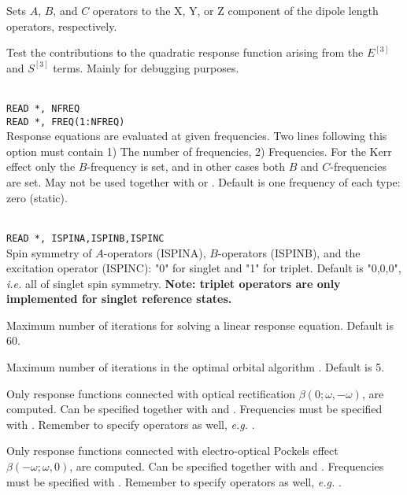 \begin{description}
\item{}
Sets $A$, $B$, and $C$ operators to the X, Y, or Z component of the
dipole length operators, respectively.

\item{}
Test the contributions to the quadratic response function arising from
the $E^{\left[3\right]}$ and $S^{\left[3\right]}$ terms.  Mainly for
debugging purposes.

\item{}\\
\verb|READ *, NFREQ|\\
\verb|READ *, FREQ(1:NFREQ)|\\
Response equations are evaluated at given
frequencies. Two lines
following this option must contain 1) The number of frequencies, 2)
Frequencies.
For the Kerr effect only the $B$-frequency is set,
and in other cases both $B$ and $C$-frequencies are set.
May not be used together with  or .
Default is one frequency of each type: zero (static).

\item{}\\
\verb|READ *, ISPINA,ISPINB,ISPINC|\\
Spin symmetry of $A$-operators (ISPINA), $B$-operators (ISPINB),
and the excitation operator (ISPINC): "0" for singlet and "1" for triplet.
Default is "0,0,0", {\it i.e.\/} all of singlet spin symmetry.
{\bf Note: triplet operators are only implemented for singlet reference states.}
\item{}
Maximum number of iterations for solving a linear response equation.
Default is 60.

\item{}
Maximum number of iterations in the optimal
orbital algorithm
\cite{tuhjahjajpjjcp84}.
Default is 5.

\item{}
Only response functions connected with optical rectification
$\beta(0; \omega,-\omega)$, are computed.
Can be specified together with  and .
Frequencies must be specified with .
Remember to specify operators as well, {\it e.g.\/} .

\item{}
Only response functions connected with electro-optical
Pockels effect
$\beta(-\omega; \omega,0)$, are computed.
Can be specified together with  and .
Frequencies must be specified with .
Remember to specify operators as well, {\it e.g.\/} .


\end{description}
